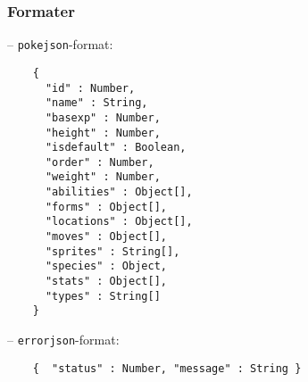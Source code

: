 \documentclass[leqno,12pt]{article}
\begin{document}
\subsubsection*{Formater}
 -- \texttt{pokejson}-format:
\begin{listing}[ht!]
\begin{verbatim}
    {  
      "id" : Number,
      "name" : String,
      "basexp" : Number,
      "height" : Number,
      "isdefault" : Boolean,
      "order" : Number,
      "weight" : Number,
      "abilities" : Object[], 
      "forms" : Object[],
      "locations" : Object[],
      "moves" : Object[],
      "sprites" : String[],
      "species" : Object,
      "stats" : Object[],
      "types" : String[]
    }
\end{verbatim}
\end{listing}

 -- \texttt{errorjson}-format:
\begin{listing}[ht!]
\begin{verbatim}
    {  "status" : Number, "message" : String }
\end{verbatim}
\end{listing}
\end{document}
